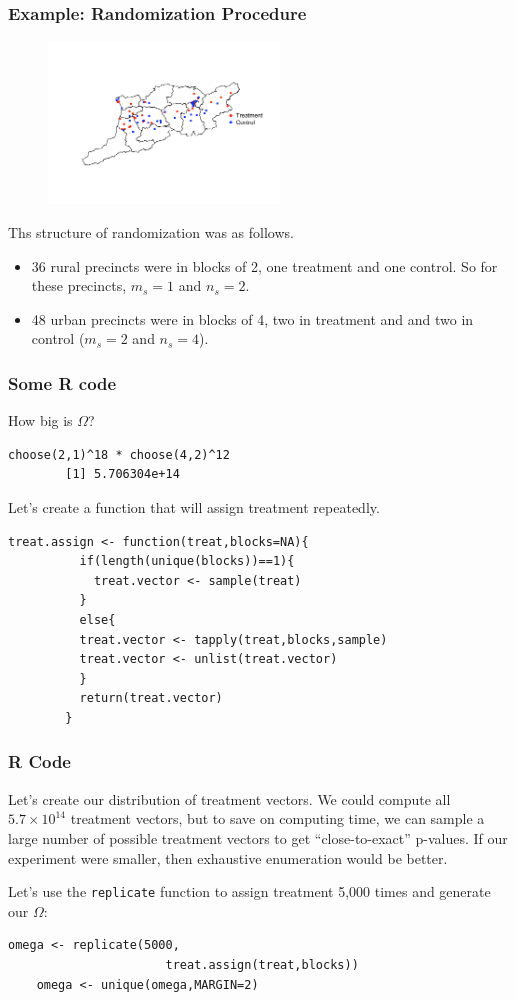 \documentclass{beamer}
\begin{document}
\begin{frame}[t]\frametitle{Example: Randomization Procedure}
	\begin{figure}[htbp]
		\centering
			\includegraphics[height=1.7in]{experiment_map.pdf}
		\label{fig:experiment_map}
	\end{figure}
	Ths structure of randomization was as follows.
	\begin{itemize}
	\item 36 rural precincts were in blocks of 2, one treatment and one
	  control. So for these precincts, $m_s=1$ and $n_s = 2$.
	\item 48 urban precincts were in blocks of 4, two in treatment and and
	  two in control ($m_s=2$ and $n_s=4$). 
	\end{itemize}
\end{frame}

\begin{frame}[fragile]\frametitle{Some R code}
	How big is $\Omega$? 
		\begin{lstlisting}[frame=single]
		choose(2,1)^18 * choose(4,2)^12
		[1] 5.706304e+14
	\end{lstlisting}
	Let's create a function that will assign treatment repeatedly. 
	\begin{lstlisting}[frame=single]
		treat.assign <- function(treat,blocks=NA){
		  if(length(unique(blocks))==1){
		    treat.vector <- sample(treat)
		  }
		  else{
		  treat.vector <- tapply(treat,blocks,sample)
		  treat.vector <- unlist(treat.vector)
		  }
		  return(treat.vector)
		}
	\end{lstlisting}
	
\end{frame}

\begin{frame}[fragile]\frametitle{R Code}
	Let's create our distribution of treatment vectors. We could compute
	all $5.7 \times 10^{14}$ treatment vectors, but to save on computing
	time, we can sample a large number of possible treatment vectors to get
	``close-to-exact'' p-values. If our experiment were smaller, then 
	exhaustive enumeration would be better.
	
	Let's use the \texttt{replicate} function to  assign
	treatment 5,000 times and generate our $\Omega$:
	\begin{lstlisting}[frame=single]
	omega <- replicate(5000,
		              treat.assign(treat,blocks))
	omega <- unique(omega,MARGIN=2)
	\end{lstlisting}
	
\end{frame}
\end{document}
